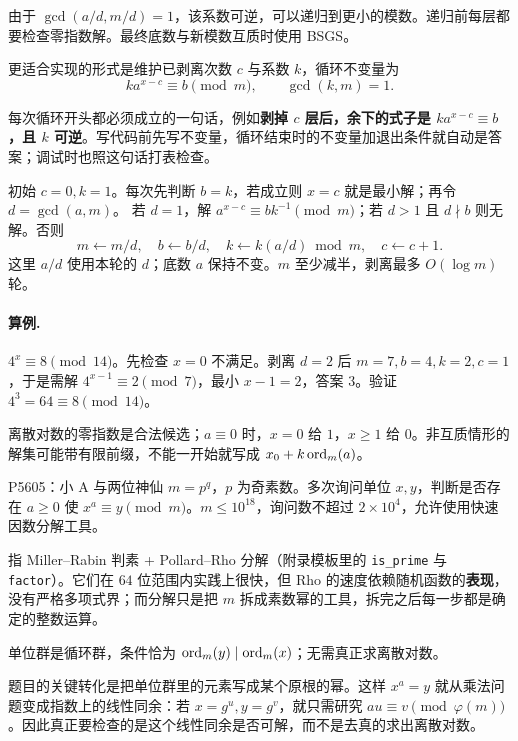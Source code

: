 由于 $\gcd(a/d,m/d)=1$，该系数可逆，可以递归到更小的模数。递归前每层都要检查零指数解。最终底数与新模数互质时使用 BSGS。


更适合实现的形式是维护已剥离次数 $c$ 与系数 $k$，循环不变量为
\[
 k a^{x-c}\equiv b\pmod m,\qquad\gcd(k,m)=1.
\]

\begin{tip}
每次循环开头都必须成立的一句话，例如\textbf{剥掉 $c$ 层后，余下的式子是 $ka^{x-c}\equiv b$，且 $k$ 可逆}。写代码前先写不变量，循环结束时的不变量加退出条件就自动是答案；调试时也照这句话打表检查。
\end{tip}

初始 $c=0,k=1$。每次先判断 $b=k$，若成立则 $x=c$ 就是最小解；再令 $d=\gcd(a,m)$。
若 $d=1$，解 $a^{x-c}\equiv bk^{-1}\pmod m$；若 $d>1$ 且 $d\nmid b$ 则无解。否则
\[
 m\gets m/d,\quad b\gets b/d,\quad
 k\gets k(a/d)\bmod m,\quad c\gets c+1.
\]
这里 $a/d$ 使用本轮的 $d$；底数 $a$ 保持不变。$m$ 至少减半，剥离最多 $O(\log m)$ 轮。

\paragraph{算例.} $4^x\equiv8\pmod{14}$。先检查 $x=0$ 不满足。剥离 $d=2$ 后 $m=7,b=4,k=2,c=1$，于是需解 $4^{x-1}\equiv2\pmod7$，最小 $x-1=2$，答案 $3$。验证 $4^3=64\equiv8\pmod{14}$。
\begin{pitfall}
离散对数的零指数是合法候选；$a\equiv0$ 时，$x=0$ 给 $1$，$x\ge1$ 给 $0$。非互质情形的解集可能带有限前缀，不能一开始就写成 $x_0+k\operatorname{ord}_m(a)$。
\end{pitfall}


\begin{problem}{P5605：小 A 与两位神仙}
$m=p^q$，$p$ 为奇素数。多次询问单位 $x,y$，判断是否存在 $a\ge0$ 使 $x^a\equiv y\pmod m$。$m\le10^{18}$，询问数不超过 $2\times10^4$，允许使用快速因数分解工具。
\end{problem}

\begin{tip}
指 Miller--Rabin 判素 + Pollard--Rho 分解（附录模板里的 \texttt{is\_prime} 与 \texttt{factor}）。它们在 $64$ 位范围内实践上很快，但 Rho 的速度依赖随机函数的\textbf{表现}，没有严格多项式界；而分解只是把 $m$ 拆成素数幂的工具，拆完之后每一步都是确定的整数运算。
\end{tip}

\hint 单位群是循环群，条件恰为 $\operatorname{ord}_m(y)\mid\operatorname{ord}_m(x)$；无需真正求离散对数。

\begin{pitfall}[讲解：先看这题到底在做什么]
题目的关键转化是把单位群里的元素写成某个原根的幂。这样 $x^a=y$ 就从乘法问题变成指数上的线性同余：若 $x=g^u,y=g^v$，就只需研究 $au\equiv v\pmod{\varphi(m)}$。因此真正要检查的是这个线性同余是否可解，而不是去真的求出离散对数。
\end{pitfall}

